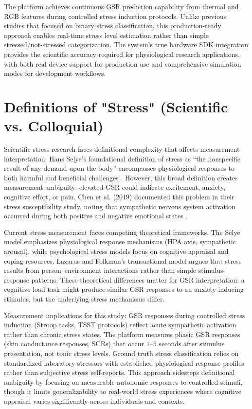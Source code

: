 \documentclass{report}
\begin{document}
    The platform achieves continuous GSR prediction capability from thermal and RGB features during controlled stress induction protocols. Unlike previous studies that focused on binary stress classification, this production-ready approach enables real-time stress level estimation rather than simple stressed/not-stressed categorization. The system's true hardware SDK integration provides the scientific accuracy required for physiological research applications, with both real device support for production use and comprehensive simulation modes for development workflows.


    \section{Definitions of "Stress" (Scientific vs. Colloquial)}
    \label{sec:stress_definitions}

    Scientific stress research faces definitional complexity that affects measurement interpretation. Hans Selye's foundational definition of stress as ``the nonspecific result of any demand upon the body'' encompasses physiological responses to both harmful and beneficial challenges \cite{selye11}. However, this broad definition creates measurement ambiguity: elevated GSR could indicate excitement, anxiety, cognitive effort, or pain. Chen et al. (2019) documented this problem in their stress susceptibility study, noting that sympathetic nervous system activation occurred during both positive and negative emotional states \cite{chen2019}.

    Current stress measurement faces competing theoretical frameworks. The Selye model emphasizes physiological response mechanisms (HPA axis, sympathetic arousal), while psychological stress models focus on cognitive appraisal and coping resources. Lazarus and Folkman's transactional model argues that stress results from person--environment interactions rather than simple stimulus-response patterns. These theoretical differences matter for GSR interpretation: a cognitive load task might produce similar GSR responses to an anxiety-inducing stimulus, but the underlying stress mechanisms differ.

    Measurement implications for this study: GSR responses during controlled stress induction (Stroop tasks, TSST protocols) reflect acute sympathetic activation rather than chronic stress states. The platform measures phasic GSR responses (skin conductance responses, SCRs) that occur $1$--$5$ seconds after stimulus presentation, not tonic stress levels. Ground truth stress classification relies on standardized laboratory stressors with established physiological response profiles rather than subjective stress self-reports. This approach sidesteps definitional ambiguity by focusing on measurable autonomic responses to controlled stimuli, though it limits generalizability to real-world stress experiences where cognitive appraisal varies significantly across individuals and contexts.
\end{document}
